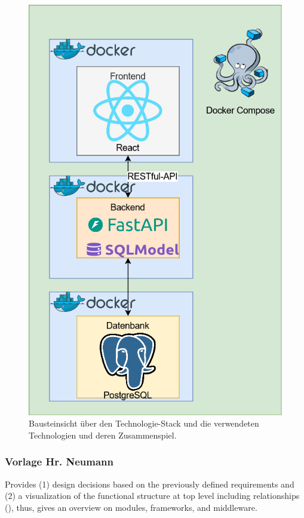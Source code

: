\documentclass[conference,a4paper]{cs-techrep}
\begin{document}
\begin{figure}
	\centering
	\includegraphics[width=0.9\linewidth]{Bausteinsicht-Architektur.drawio}
	\caption{Bausteinsicht über den Technologie-Stack und die verwendeten Technologien und deren Zusammenspiel.}
	\label{fig:bausteinsicht-architektur}
\end{figure}


\subsubsection{Vorlage Hr. Neumann}
Provides
(1) design decisions based on the previously defined requirements and
(2) a visualization of the functional structure at top level including relationships (), thus, gives an overview on modules, frameworks, and middleware.
\end{document}
